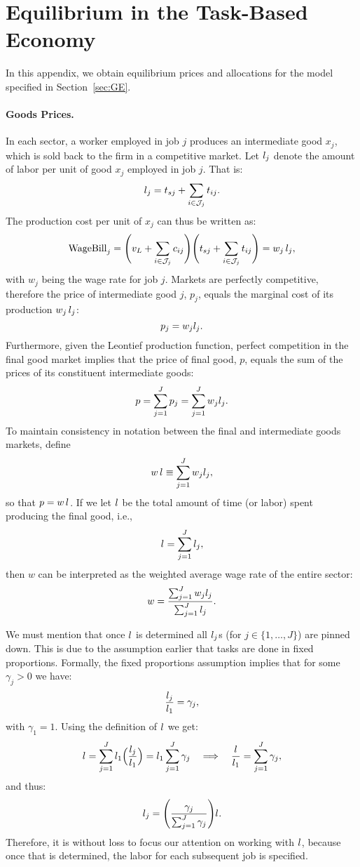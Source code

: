 \documentclass{article}
\theoremstyle{plain}
\theoremstyle{plain}
\begin{document}
\section{Equilibrium in the Task-Based Economy}
\label{app:GE}

In this appendix, we obtain equilibrium prices and allocations for the model specified in Section~\ref{sec:GE}.


\paragraph{Goods Prices.}  
In each sector, a worker employed in job $j$ produces an intermediate good $x_j$, which is sold back to the firm in a competitive market.  
Let $l_{j}$ denote the amount of labor per unit of good $x_j$ employed in job $j$.
That is:  
\[
l_{j} = t_{sj} + \sum_{i \in \mathcal{J}_j} t_{ij}.
\]  
The production cost per unit of $x_j$ can thus be written as:  
\[
\text{WageBill}_j = \Biggl(v_L + \sum_{i \in \mathcal{J}_j} c_{ij} \Biggr) \Biggl(t_{sj} + \sum_{i \in \mathcal{J}_j} t_{ij} \Biggr) = w_j \,l_{j},
\]  
with $w_j$ being the wage rate for job $j$.
Markets are perfectly competitive, therefore the price of intermediate good $j$, $p_j$, equals the marginal cost of its production $w_j\,l_{j}$:
\[
p_j = w_j l_{j}.
\]  
Furthermore, given the Leontief production function, perfect competition in the final good market implies that the price of final good, $p$, equals the sum of the prices of its constituent intermediate goods:
\[
p = \sum_{j=1}^J p_j = \sum_{j=1}^J w_j l_{j}.
\]  
To maintain consistency in notation between the final and intermediate goods markets, define  
\[
w \, l_{} \equiv \sum_{j=1}^J w_j l_{j},
\]
so that $p = w \, l_{}$.  
If we let $l_{}$ be the total amount of time (or labor) spent producing the final good, i.e.,
\[
l_{} = \sum_{j=1}^J l_{j},
\]
then $w$ can be interpreted as the weighted average wage rate of the entire sector:
\[
w = \frac{\sum_{j=1}^J w_j l_{j}}{\sum_{j=1}^J l_{j}}.
\]

We must mention that once $l_{}$ is determined all $l_{j}$s (for $j \in \{1,\ldots,J\}$) are pinned down.
This is due to the assumption earlier that tasks are done in fixed proportions.
Formally, the fixed proportions assumption implies that for some $\gamma_j > 0$ we have:  
\[
\frac{l_{j}}{l_{1}} = \gamma_j,
\]  
with $\gamma_1 = 1$.  
Using the definition of $l_{}$ we get: 
\[
l_{} = \sum_{j=1}^J l_{1} \Bigl(\frac{l_{j}}{l_{1}} \Bigr) = l_{1} \sum_{j=1}^J \gamma_j 
\quad 
\Longrightarrow
\quad 
\frac{l_{}}{l_{1}} = \sum_{j=1}^J \gamma_j,
\]  
and thus:  
\[
l_{j} = \Bigg( \frac{\gamma_j}{\sum_{j=1}^J \gamma_j} \Bigg) l_{}.
\]  
Therefore, it is without loss to focus our attention on working with $l_{}$, because once that is determined, the labor for each subsequent job is specified.
\end{document}
